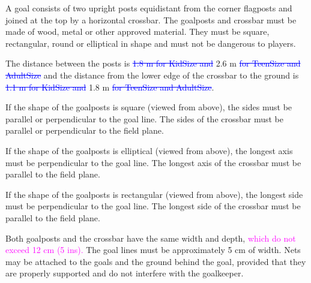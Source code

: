 \bigskip

A goal consists of two upright posts equidistant from the corner flagposts and joined at the top by a horizontal crossbar. The goalposts and crossbar must be made of wood, metal or other approved material. They must be square, rectangular, round or elliptical in shape and must
not be dangerous to players.

\bigskip

The distance between the posts is \textcolor{blue}{\sout{1.8 m for KidSize and}} 2.6 m \textcolor{blue}{\sout{for TeenSize and AdultSize}} and the distance from the lower edge of the crossbar to the ground is \textcolor{blue}{\sout{1.1 m for KidSize and}} 1.8 m \textcolor{blue}{\sout{for TeenSize and AdultSize}}. 


\bigskip


\bigskip


\bigskip

If the shape of the goalposts is square (viewed from above), the sides must be parallel or perpendicular to the goal line. The sides of the crossbar must be parallel or perpendicular to the field plane.

\bigskip

If the shape of the goalposts is elliptical (viewed from above), the longest axis must be perpendicular to the goal line. The longest axis of the crossbar must be parallel to the field plane.

\bigskip

If the shape of the goalposts is rectangular (viewed from above), the longest side must be perpendicular to the goal line. The longest side of the crossbar must be parallel to the field plane.

\bigskip

Both goalposts and the crossbar have the same width and depth, \textcolor{magenta}{which do not exceed 12 cm (5 ins).} 
The goal lines must be approximately 5 cm of width. 
Nets may be attached to the goals and the ground behind the goal, provided that they are properly supported and do not interfere with the goalkeeper.

